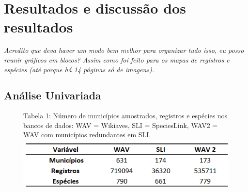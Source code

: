 \section{Resultados e discussão dos resultados}

\color{blue}\textit{Acredito que deva haver um modo bem melhor para organizar tudo isso, eu posso reunir gráficos em blocos? Assim como foi feito para os mapas de registros e espécies (até porque há 14 páginas só de imagens).}\color{black}

\subsection{Análise Univariada}

\begin{figure}[h!]
\centering
{\scriptsize Tabela 1: Número de municípios amostrados, registros e espécies nos bancos de dados: WAV = Wikiaves, SLI = SpeciesLink, WAV2 = WAV com municípios redundantes em SLI.}
\includegraphics{Tabelas/1.png}
\label{t01}
\end{figure}

